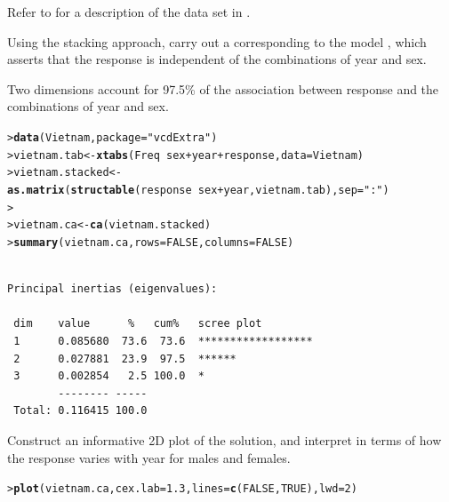 \documentclass[10pt]{report}\usepackage[]{graphicx}\usepackage[]{color}
\makeatletter
\newcommand{\hlnum}[1]{\textcolor[rgb]{0.686,0.059,0.569}{#1}}%
\newcommand{\hlstr}[1]{\textcolor[rgb]{0.192,0.494,0.8}{#1}}%
\newcommand{\hlopt}[1]{\textcolor[rgb]{0,0,0}{#1}}%
\newcommand{\hlstd}[1]{\textcolor[rgb]{0.345,0.345,0.345}{#1}}%
\newcommand{\hlkwb}[1]{\textcolor[rgb]{0.69,0.353,0.396}{#1}}%
\newcommand{\hlkwc}[1]{\textcolor[rgb]{0.333,0.667,0.333}{#1}}%
\newcommand{\hlkwd}[1]{\textcolor[rgb]{0.737,0.353,0.396}{\textbf{#1}}}%
\newenvironment{kframe}{%
 \def\at@end@of@kframe{}%
 \ifinner\ifhmode%
  \def\at@end@of@kframe{\end{minipage}}%
  \begin{minipage}{\columnwidth}%
 \fi\fi%
 \def\FrameCommand##1{\hskip\@totalleftmargin \hskip-\fboxsep
 \colorbox{shadecolor}{##1}\hskip-\fboxsep
     \hskip-\linewidth \hskip-\@totalleftmargin \hskip\columnwidth}%
 \MakeFramed {\advance\hsize-\width
   \@totalleftmargin\z@ \linewidth\hsize
   \@setminipage}}%
 {\par\unskip\endMakeFramed%
 \at@end@of@kframe}
\newenvironment{knitrout}{}{} %
\renewenvironment{knitrout}{\small\renewcommand{\baselinestretch}{.85}}{} %
\makeatother
\begin{document}
\begin{Exercises}
\exercise\label{lab:ca-vietnam} Refer to  for a description of the  data set
  in . 
  \begin{enumerate*}
    \item Using the stacking approach, carry out a \ca corresponding to the \loglin model , which asserts
    that the response is independent of the combinations of year and sex.  
    \begin{ans}
    Two dimensions account for 97.5\% of the association between response and the combinations of year and sex.
\begin{knitrout}\footnotesize
{}\color{fgcolor}\begin{kframe}
\begin{alltt}
\hlstd{> }\hlkwd{data}\hlstd{(Vietnam,} \hlkwc{package}\hlstd{=}\hlstr{"vcdExtra"}\hlstd{)}
\hlstd{> }\hlstd{vietnam.tab} \hlkwb{<-} \hlkwd{xtabs}\hlstd{(Freq} \hlopt{~} \hlstd{sex} \hlopt{+} \hlstd{year} \hlopt{+} \hlstd{response,} \hlkwc{data}\hlstd{=Vietnam)}
\hlstd{> }\hlstd{vietnam.stacked} \hlkwb{<-} \hlkwd{as.matrix}\hlstd{(}\hlkwd{structable}\hlstd{(response} \hlopt{~} \hlstd{sex} \hlopt{+} \hlstd{year, vietnam.tab),} \hlkwc{sep}\hlstd{=}\hlstr{":"}\hlstd{)}
\hlstd{> }
\hlstd{> }\hlstd{vietnam.ca} \hlkwb{<-} \hlkwd{ca}\hlstd{(vietnam.stacked)}
\hlstd{> }\hlkwd{summary}\hlstd{(vietnam.ca,} \hlkwc{rows}\hlstd{=}\hlnum{FALSE}\hlstd{,} \hlkwc{columns}\hlstd{=}\hlnum{FALSE}\hlstd{)}
\end{alltt}
\begin{verbatim}

Principal inertias (eigenvalues):

 dim    value      %   cum%   scree plot               
 1      0.085680  73.6  73.6  ******************       
 2      0.027881  23.9  97.5  ******                   
 3      0.002854   2.5 100.0  *                        
        -------- -----                                 
 Total: 0.116415 100.0                                 
\end{verbatim}
\end{kframe}
\end{knitrout}

    \end{ans}
    
    \item Construct an informative 2D plot of the solution, and interpret in terms of how the response varies 
    with year for males and females.
    \begin{ans}
\begin{knitrout}\footnotesize
{}\color{fgcolor}\begin{kframe}
\begin{alltt}
\hlstd{> }\hlkwd{plot}\hlstd{(vietnam.ca,} \hlkwc{cex.lab}\hlstd{=}\hlnum{1.3}\hlstd{,} \hlkwc{lines}\hlstd{=}\hlkwd{c}\hlstd{(}\hlnum{FALSE}\hlstd{,} \hlnum{TRUE}\hlstd{),} \hlkwc{lwd}\hlstd{=}\hlnum{2}\hlstd{)}
\end{alltt}
\end{kframe}


\end{knitrout}
\end{ans}
\end{enumerate*}
\end{Exercises}
\end{document}
